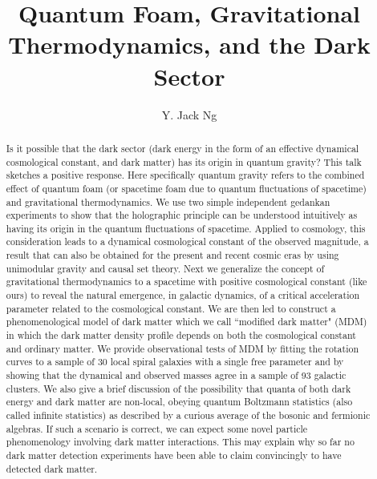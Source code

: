\documentclass[a4paper]{jpconf}
\begin{document}
\title{Quantum Foam, Gravitational Thermodynamics, and the Dark Sector}

\author{Y. Jack Ng}

\address {Institute of Field Physics, Department of Physics \& Astronomy,
University of North Carolina, Chapel Hill, NC 27599-3255, USA}


\begin{abstract}

Is it possible that the dark sector (dark energy in the form of 
an effective dynamical
cosmological constant, and dark matter) has its origin in quantum gravity?
This talk sketches a positive response. Here specifically quantum gravity 
refers to the combined effect 
of quantum foam (or spacetime foam due to quantum fluctuations
of spacetime) and gravitational thermodynamics.  We use two simple independent
gedankan experiments to show 
that the holographic principle
can be understood intuitively as having its origin in the quantum fluctuations 
of spacetime.  Applied to
cosmology, this consideration leads to a dynamical cosmological constant 
of the observed magnitude, a result that can also be obtained 
for the present and recent cosmic eras by using
unimodular gravity and causal set theory.  Next we  
generalize the concept of gravitational thermodynamics to a spacetime
with positive cosmological constant (like ours)
to reveal the natural emergence, in galactic dynamics, of a critical 
acceleration parameter related to the cosmological constant.  We are then led 
to construct a phenomenological model of dark matter which we call ``modified 
dark matter" (MDM) in which the dark matter density profile depends on
both the cosmological constant and ordinary matter. 
We provide observational tests of MDM 
by fitting the rotation curves to a sample 
of 30 local spiral galaxies
with a single free parameter and by showing that the dynamical and observed 
masses agree in a sample of
93 galactic clusters.  We also give a brief discussion 
of the possibility that quanta of both
dark energy and dark matter are non-local, obeying quantum
Boltzmann statistics (also called infinite statistics) as described by a 
curious average of the bosonic and 
fermionic algebras.  If such a scenario is correct, we can expect some
novel particle phenomenology involving dark matter interactions.  This may
explain why so far no dark matter detection experiments 
have been able to claim 
convincingly to have detected dark matter.


\end{abstract}
\end{document}
